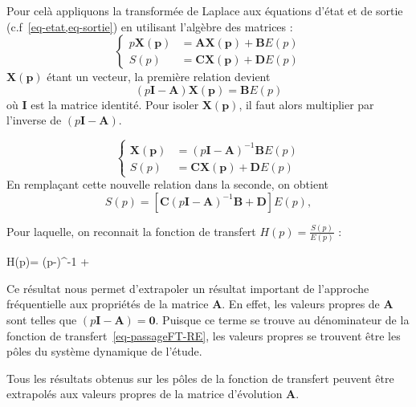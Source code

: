 Pour celà appliquons la transformée de Laplace aux équations d'état et de 
sortie (c.f~\cref{eq-etat,eq-sortie}) en utilisant l'algèbre des matrices :
\[
    \begin{cases}
        p\boldsymbol{X(p)}&=\boldsymbol{AX(p)}+\boldsymbol{B}E(p) \\
        S(p) &= \boldsymbol{CX(p)}+\boldsymbol{D}E(p)
    \end{cases}
\]
$\boldsymbol{X(p)}$ étant un vecteur, la première relation devient 
\[
    (p\boldsymbol{I}-\boldsymbol{A})\boldsymbol{X(p)}=\boldsymbol{B}E(p)
\]
où $\boldsymbol{I}$ est la matrice identité. Pour isoler $\boldsymbol{X(p)}$, 
il faut alors multiplier par l'inverse de $(p\boldsymbol{I}-\boldsymbol{A})$.

\[
\begin{cases}
\boldsymbol{X(p)}&=(p\boldsymbol{I}-\boldsymbol{A})^{-1}\boldsymbol{B}E(p) \\
 S(p)&=\boldsymbol{CX(p)}+\boldsymbol{D}E(p)
\end{cases}
\]
En remplaçant cette nouvelle relation dans la seconde, on obtient 
\[
    S(p)=\left[\boldsymbol{C}(p\boldsymbol{I}-\boldsymbol{A})^{-1}
         \boldsymbol{B}+\boldsymbol{D}\right]E(p),
\]

\captionsetup{width=0.9\linewidth}
Pour laquelle, on reconnait la fonction de transfert $H(p)=\frac{S(p)}{E(p)}$ :
\begin{bequation}
    H(p)=
          \left(p-\right)^{-1}
          +
          \label{eq-passageFT-RE}
\end{bequation}
Ce résultat nous permet d'extrapoler un résultat important de l'approche 
fréquentielle aux propriétés de la matrice $\boldsymbol{A}$. En effet, les
valeurs propres de $\boldsymbol{A}$ sont telles que 
$\left(p\boldsymbol{I}-\boldsymbol{A}\right)=\boldsymbol{0}$. Puisque ce terme 
se trouve au dénominateur de la fonction de transfert~\cref{eq-passageFT-RE},
les valeurs propres se trouvent être les pôles du système dynamique de l'étude.

Tous les résultats obtenus sur les pôles de la fonction de transfert peuvent
être extrapolés aux valeurs propres de la matrice d'évolution $\boldsymbol{A}$.
